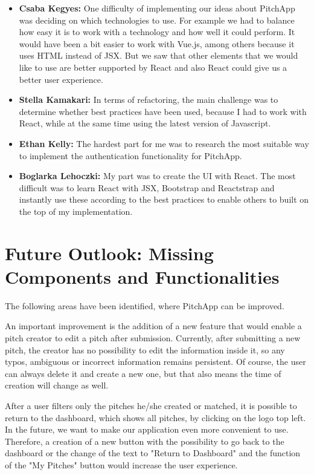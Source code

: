 \begin{itemize}
	\item \textbf{Csaba Kegyes:} One difficulty of implementing our ideas about PitchApp was deciding on which technologies to use. For example we had to balance how easy it is to work with a technology and how well it could perform. It would have been a bit easier to work with Vue.js, among others because it uses HTML instead of JSX. But we saw that other elements that we would like to use are better supported by React and also React could give us a better user experience.
    \item \textbf{Stella Kamakari:} In terms of refactoring, the main challenge was to determine whether best practices have been used, because I had to work with React, while at the same time using the latest version of Javascript.
	\item \textbf{Ethan Kelly:} The hardest part for me was to research the most suitable way to implement the authentication functionality for PitchApp.
	\item \textbf{Boglarka Lehoczki:} My part was to create the UI with React. The most difficult was to learn React with JSX, Bootstrap and Reactstrap and instantly use these according to the best practices to enable others to built on the top of my implementation.

\end{itemize}
\chapter{Future Outlook: Missing Components and Functionalities}


The following areas have been identified, where PitchApp can be improved.

An important improvement is the addition of a new feature that would enable a pitch creator to edit a pitch after submission. Currently, after submitting a new pitch, the creator has no possibility to edit the information inside it, so any typos, ambiguous or incorrect information remains persistent. Of course, the user can always delete it and create a new one, but that also means the time of creation will change as well.

After a user filters only the pitches he/she created or matched, it is possible to return to the dashboard, which shows all pitches, by clicking on the logo top left. In the future, we want to make our application even more convenient to use. Therefore, a creation of a new button with the possibility to go back to the dashboard  or the change of the text to "Return to Dashboard" and the function of the "My Pitches" button would increase the user experience.

